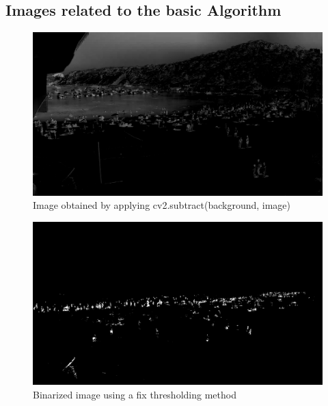 \documentclass[11pt]{article}
\begin{document}
\newpage
\begin{appendices}
    \section{Images related to the basic Algorithm}

    

    \begin{figure}[h]
        \centering
        \includegraphics[width=\textwidth, height=\textheight, keepaspectratio]{img/sub.jpg}
        \caption{Image obtained by applying cv2.subtract(background, image)}
        \label{fig:sub}
    \end{figure}

    \begin{figure} [h]
        \centering
        \includegraphics[width=\textwidth]{img/bin_th.jpg}
        \caption{Binarized image using a fix thresholding method}
        \label{fig:binth}
    \end{figure}
    

\end{appendices}
\end{document}
